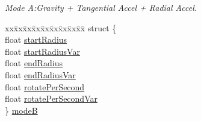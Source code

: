 \begin{DoxyCompactItemize}
\begin{tabbing}
\end{tabbing}\begin{DoxyCompactList}\small\item\em Mode A\+:Gravity + Tangential Accel + Radial Accel. \end{DoxyCompactList}\item 
\mbox{\label{classParticleSystem_ac43496e2052b9209aa1dd8c61730863d}} 
\begin{tabbing}
xx\=xx\=xx\=xx\=xx\=xx\=xx\=xx\=xx\=\kill
struct \{\\
\>float \hyperlink{classParticleSystem_ad3033aadd088e0d11192096f5ad66384}{startRadius}\\
\>float \hyperlink{classParticleSystem_a6144edbe628515ebe32c57c2c67e35cc}{startRadiusVar}\\
\>float \hyperlink{classParticleSystem_a26521c52751fab3520bfd1edbddb581f}{endRadius}\\
\>float \hyperlink{classParticleSystem_a9a50b646561863981982c5e850ee1c8b}{endRadiusVar}\\
\>float \hyperlink{classParticleSystem_abc209d18b4cfab32d2ee47bbda8300c9}{rotatePerSecond}\\
\>float \hyperlink{classParticleSystem_a3aa049ca97987019baed0d0bd959b18b}{rotatePerSecondVar}\\
\} \hyperlink{classParticleSystem_ac43496e2052b9209aa1dd8c61730863d}{modeB}\\


\end{tabbing}
\end{DoxyCompactItemize}
